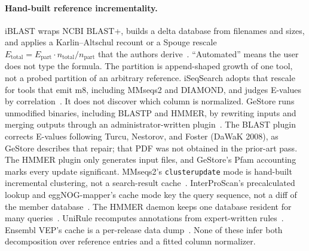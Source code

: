 \documentclass[letterpaper,twocolumn,10pt]{article}
\begin{document}
\paragraph{Hand-built reference incrementality.}
iBLAST wraps NCBI BLAST+, builds a delta database from filenames and sizes, and applies a Karlin--Altschul recount or a Spouge rescale $E_{\mathrm{total}} = E_{\mathrm{part}} \cdot n_{\mathrm{total}} / n_{\mathrm{part}}$ that the authors derive~\cite{dash2021iblast}.
``Automated'' means the user does not type the formula.
The partition is append-shaped growth of one tool, not a probed partition of an arbitrary reference.
iSeqSearch adopts that rescale for tools that emit m8, including MMseqs2 and DIAMOND, and judges E-values by correlation~\cite{yoo2025iseqsearch}.
It does not discover which column is normalized.
GeStore runs unmodified binaries, including BLASTP and HMMER, by rewriting inputs and merging outputs through an administrator-written plugin~\cite{pedersen2014gestore}.
The BLAST plugin corrects E-values following Turcu, Nestorov, and Foster (DaWaK 2008), as GeStore describes that repair; that PDF was not obtained in the prior-art pass.
The HMMER plugin only generates input files, and GeStore's Pfam accounting marks every update significant.
MMseqs2's \texttt{clusterupdate} mode is hand-built incremental clustering, not a search-result cache~\cite{steinegger2017mmseqs2}.
InterProScan's precalculated lookup and eggNOG-mapper's cache mode key the query sequence, not a diff of the member database~\cite{cantalapiedra2021eggnog,eggnog-cache-wiki}.
The HMMER daemon keeps one database resident for many queries~\cite{eddy2011hmmer}.
UniRule recomputes annotations from expert-written rules~\cite{macdougall2020unirule}.
Ensembl VEP's cache is a per-release data dump~\cite{mclaren2016vep}.
None of these infer both decomposition over reference entries and a fitted column normalizer.
\end{document}
